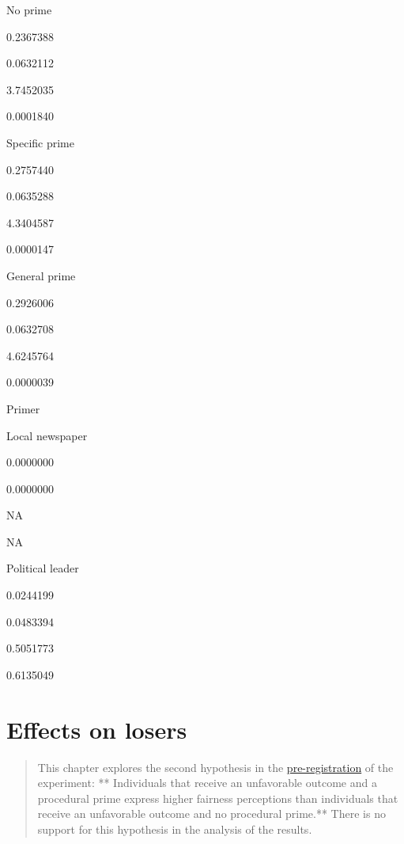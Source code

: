 \documentclass[]{book}
\begin{document}
No prime

0.2367388

0.0632112

3.7452035

0.0001840

Specific prime

0.2757440

0.0635288

4.3404587

0.0000147

General prime

0.2926006

0.0632708

4.6245764

0.0000039

Primer

Local newspaper

0.0000000

0.0000000

NA

NA

Political leader

0.0244199

0.0483394

0.5051773

0.6135049

\chapter{Effects on losers}\label{effects-on-losers-2}

\begin{quote}
This chapter explores the second hypothesis in the
\href{GoogLoser_Prereg_3_\#16823\%5B16065\%5D.pdf}{pre-registration} of
the experiment: ** Individuals that receive an unfavorable outcome and a
procedural prime express higher fairness perceptions than individuals
that receive an unfavorable outcome and no procedural prime.** There is
no support for this hypothesis in the analysis of the results.
\end{quote}
\end{document}
